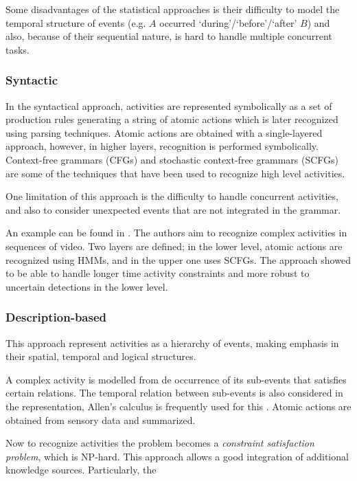 Some disadvantages of the statistical approaches is their difficulty to model the temporal structure of events (e.g. $A$ occurred `during'/`before'/`after' $B$) and also, because of their sequential nature, is hard to handle multiple concurrent tasks.

\subsubsection{Syntactic}
In the syntactical approach, activities are represented symbolically as a set of production rules generating a string of atomic actions which is later recognized using parsing techniques.
Atomic actions are obtained with a single-layered approach, however, in higher layers, recognition is performed symbolically.
Context-free grammars (CFGs) and stochastic context-free grammars (SCFGs) are some of the techniques that have been used to recognize high level activities.

One limitation of this approach is the difficulty to handle concurrent activities, and also to consider unexpected events that are not integrated in the grammar.

An example can be found in \citep{Ivanov2000_RecVisActSCFG}.
The authors aim to recognize complex activities in sequences of video.
Two layers are defined; in the lower level, atomic actions are recognized using HMMs, and in the upper one uses SCFGs.
The approach showed to be able to handle longer time activity constraints and more robust to uncertain detections in the lower level.


\subsubsection{Description-based} \label{sec_description_ap}
This approach represent activities as a hierarchy of events, making emphasis in their spatial, temporal and logical structures.

A complex activity is modelled from de occurrence of its sub-events that satisfies certain relations.
The temporal relation between sub-events is also considered in the representation, Allen's calculus is frequently used for this \citep{Allen83_MaintainingKnowledgeTemporal}.
Atomic actions are obtained from sensory data and summarized. %

Now to recognize activities the problem becomes a \textit{constraint satisfaction problem}, which is NP-hard.
This approach allows a good integration of additional knowledge sources. 
Particularly, the 

